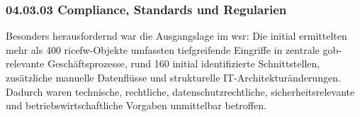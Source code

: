 \subsubsection*{04.03.03 Compliance, Standards und Regularien}
\label{sec:04.03.03_ComplianceStandardsUndRegularien}


\par Besonders herausfordernd war die Ausgangslage im \gls{wsr}: Die initial ermittelten mehr als 400 \gls{ricefw}-Objekte umfassten tiefgreifende Eingriffe in zentrale \gls{gob}-relevante Geschäftsprozesse, rund 160 initial identifizierte Schnittstellen, zusätzliche manuelle Datenflüsse und strukturelle IT-Architekturänderungen. Dadurch waren technische, rechtliche, datenschutzrechtliche, sicherheitsrelevante und betriebswirtschaftliche Vorgaben unmittelbar betroffen.